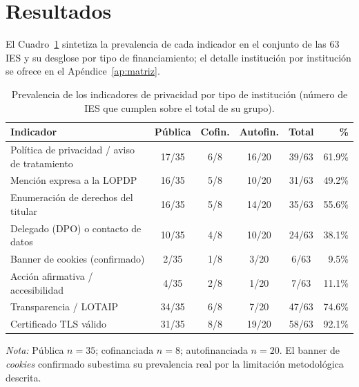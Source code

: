 \documentclass[11pt,a4paper]{article}
\begin{document}
\section{Resultados}
El Cuadro~\ref{tab:resumen} sintetiza la prevalencia de cada indicador en el conjunto de las 63 IES y su desglose por tipo de financiamiento; el detalle instituci\'on por instituci\'on se ofrece en el Ap\'endice~\ref{ap:matriz}.

\begin{table}[htbp]
	\centering
	\caption{Prevalencia de los indicadores de privacidad por tipo de instituci\'on (n\'umero de IES que cumplen sobre el total de su grupo).}
	\label{tab:resumen}
	\small
	\begin{tabular}{@{}p{6.6cm}cccc r@{}}
		\toprule
		\textbf{Indicador} & \textbf{P\'ublica} & \textbf{Cofin.} & \textbf{Autofin.} & \textbf{Total} & \textbf{\%} \\
		\midrule
	Pol\'itica de privacidad / aviso de tratamiento & 17/35 & 6/8 & 16/20 & 39/63 & 61.9\% \\
	Menci\'on expresa a la LOPDP & 16/35 & 5/8 & 10/20 & 31/63 & 49.2\% \\
	Enumeraci\'on de derechos del titular & 16/35 & 5/8 & 14/20 & 35/63 & 55.6\% \\
	Delegado (DPO) o contacto de datos & 10/35 & 4/8 & 10/20 & 24/63 & 38.1\% \\
	Banner de cookies (confirmado) & 2/35 & 1/8 & 3/20 & 6/63 & 9.5\% \\
	Acci\'on afirmativa / accesibilidad & 4/35 & 2/8 & 1/20 & 7/63 & 11.1\% \\
	Transparencia / LOTAIP & 34/35 & 6/8 & 7/20 & 47/63 & 74.6\% \\
	Certificado TLS v\'alido & 31/35 & 8/8 & 19/20 & 58/63 & 92.1\% \\
		\bottomrule
	\end{tabular}
	\par\vspace{2pt}
	\footnotesize\RaggedRight\textit{Nota:} P\'ublica $n=35$; cofinanciada $n=8$; autofinanciada $n=20$. El banner de \emph{cookies} confirmado subestima su prevalencia real por la limitaci\'on metodol\'ogica descrita.
\end{table}
\end{document}

